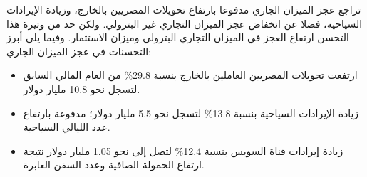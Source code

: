 تراجع عجز الميزان الجاري مدفوعا بارتفاع تحويلات المصريين بالخارج، وزيادة الإيرادات السياحية، فضلا عن انخفاض عجز الميزان التجاري غير البترولي. ولكن حد من وتيرة هذا التحسن ارتفاع العجز في الميزان التجاري البترولي وميزان الاستثمار. وفيما يلي أبرز التحسنات في عجز الميزان الجاري:
\begin{itemize}
    \item ارتفعت تحويلات المصريين العاملين بالخارج بنسبة 29.8\% من العام المالي السابق لتسجل نحو 10.8 مليار دولار.
    \item زيادة الإيرادات السياحية بنسبة 13.8\% لتسجل نحو 5.5 مليار دولار؛ مدفوعة بارتفاع عدد الليالي السياحية.
    \item زيادة إيرادات قناة السويس بنسبة 12.4\% لتصل إلى نحو 1.05 مليار دولار نتيجة ارتفاع الحمولة الصافية وعدد السفن العابرة.
\end{itemize}
